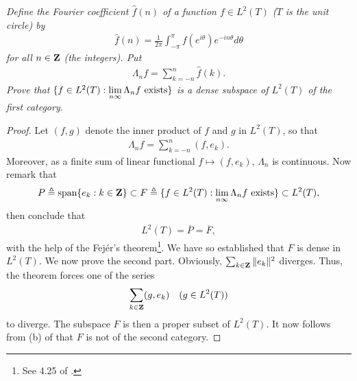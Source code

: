 \textit{
Define the Fourier coefficient $\hat{f}(n)$ of a function %
%
  $f\in L^2(T)$ ($T$ is the unit circle) %
%
by
%
  \begin{align*}
  \hat{f}(n) 
    = 
  \frac{1}{2\pi} \int_{\minus \pi}^{\pi} %
    f(e^{i\theta}) e^{\minus i n\theta} d\theta
  \end{align*}
%
for all $n\in {\mathbf Z}$ (the integers). Put 
%
  \begin{align*}
    \Lambda_n f =\sum_{k=\minus n }^{n} \hat{f}(k).
  \end{align*}
%
Prove that %
  $\{f \in {L}^2(T): \underset{n\infty}{\lim}\,\Lambda_n f \text{ exists}\} $ %
%
is a dense subspace of $L^2(T)$ of the first category. %
}
%
\begin{proof}Let $(f,g)$ denote the inner product of $f$ and $g$ in $L^2(T)$, %
so that 
  \begin{align}
    \Lambda_n f = \sum_{k=\minus n}^n (f, e_k). 
  \end{align}
%
Moreover, as a finite sum of linear functional $f \mapsto (f, e_k)$, %
$\Lambda_n$ is continuous. 
Now remark that 
% 
  \begin{align}
    P \triangleq \text{span}\{ e_k: k\in {\mathbf Z}\} 
      \subset 
    F \triangleq \{
        f \in {L}^2(T)
      : 
        \lim_{n\infty} \Lambda_n f \text{ exists}
    \} \subset {L}^2(T), 
  \end{align}
%
then conclude that %
%
  \begin{align}
    {L}^2(T)= \overline{P} = \overline{ F},
  \end{align}
%
with the help of the Fejér's theorem\footnote{
%
  See 4.25 of \cite{BigRudin}.}. %
%
We have so established that $F$ is dense in $L^2(T)$. %
We now prove the second part. %
\newline\newline\noindent
%
Obviously, $\sum_{k\in {\mathbf Z}} \| e_k\|^2$ diverges. %
Thus, the theorem  forces one of the series %
%
  \begin{align}
    \sum_{k\in {\mathbf Z}} (g, e_k) \quad (g \in L^2(T))
  \end{align}
%
to diverge. %
The subspace $F$ is then a proper subset of ${L}^2(T)$. %
It now follows from (b) of  that %
%
  $F$ is not of the second category. %
%
\end{proof}










